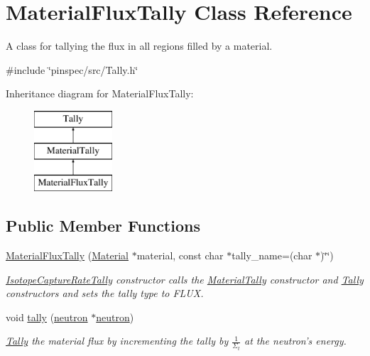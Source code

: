 \hypertarget{classMaterialFluxTally}{\section{Material\-Flux\-Tally Class Reference}
\label{classMaterialFluxTally}
}


A class for tallying the flux in all regions filled by a material.  




{\ttfamily \#include \char`\"{}pinspec/src/\-Tally.\-h\char`\"{}}

Inheritance diagram for Material\-Flux\-Tally\-:\begin{figure}[H]
\begin{center}
\leavevmode
\includegraphics[height=3.000000cm]{classMaterialFluxTally}
\end{center}
\end{figure}
\subsection*{Public Member Functions}
\begin{DoxyCompactItemize}
\item 
\hyperlink{classMaterialFluxTally_ab1deeebac35f38d8f3c56f1b5c4b0eb5}{Material\-Flux\-Tally} (\hyperlink{classMaterial}{Material} $\ast$material, const char $\ast$tally\-\_\-name=(char $\ast$)\char`\"{}\char`\"{})
\begin{DoxyCompactList}\small\item\em \hyperlink{classIsotopeCaptureRateTally}{Isotope\-Capture\-Rate\-Tally} constructor calls the \hyperlink{classMaterialTally}{Material\-Tally} constructor and \hyperlink{classTally}{Tally} constructors and sets the tally type to F\-L\-U\-X. \end{DoxyCompactList}\item 
void \hyperlink{classMaterialFluxTally_a458d77b55dbd6bd0fb5efeb2ffec2e9b}{tally} (\hyperlink{structneutron}{neutron} $\ast$\hyperlink{structneutron}{neutron})
\begin{DoxyCompactList}\small\item\em \hyperlink{classTally}{Tally} the material flux by incrementing the tally by $ \frac{1}{\Sigma_t} $ at the neutron's energy. \end{DoxyCompactList}\end{DoxyCompactItemize}
